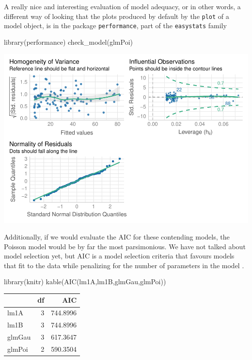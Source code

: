 \documentclass[
]{book}
\newenvironment{Shaded}{\begin{snugshade}}{\end{snugshade}}
\newcommand{\FunctionTok}[1]{\textcolor[rgb]{0.00,0.00,0.00}{#1}}
\newcommand{\NormalTok}[1]{#1}
\begin{document}
A really nice and interesting evaluation of model adequacy, or in other words, a different way of looking that the plots produced by default by the \texttt{plot} of a model object, is in the package \texttt{performance}, part of the \texttt{easystats} family

\begin{Shaded}
\begin{Highlighting}[]
\FunctionTok{library}\NormalTok{(performance)}
\FunctionTok{check\_model}\NormalTok{(glmPoi)}
\end{Highlighting}
\end{Shaded}

\includegraphics{ECOMODbook_files/figure-latex/unnamed-chunk-6-1.pdf}

Additionally, if we would evaluate the AIC for these contending models, the Poisson model would be by far the most parsimonious. We have not talked about model selection yet, but AIC is a model selection criteria that favours models that fit to the data while penalizing for the number of parameters in the model \citep[e.g.][]{Aho2014}.

\begin{Shaded}
\begin{Highlighting}[]
\FunctionTok{library}\NormalTok{(knitr)}
\FunctionTok{kable}\NormalTok{(}\FunctionTok{AIC}\NormalTok{(lm1A,lm1B,glmGau,glmPoi))}
\end{Highlighting}
\end{Shaded}

\begin{tabular}{l|r|r}
\hline
  & df & AIC\\
\hline
lm1A & 3 & 744.8996\\
\hline
lm1B & 3 & 744.8996\\
\hline
glmGau & 3 & 617.3647\\
\hline
glmPoi & 2 & 590.3504\\
\hline
\end{tabular}
\end{document}
